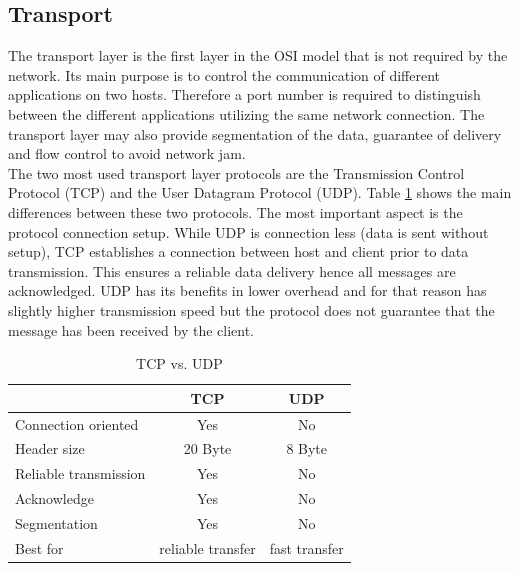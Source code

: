 \subsection{Transport} 
The transport layer is the first layer in the OSI model that is not required by
the network. Its main purpose is to control the communication of different
applications on two hosts. Therefore a port number is required to distinguish
between the different applications utilizing the same network connection. The
transport layer may also provide segmentation of the data, guarantee of delivery
and flow control to avoid network jam.
\\

The two most used transport layer protocols are the Transmission Control
Protocol (TCP) and the User Datagram Protocol (UDP). Table \ref{tab:tcpudp}
shows the main differences between these two protocols. The most important
aspect is the protocol connection setup. While UDP is connection less (data is
sent without setup), TCP establishes a connection between host and client
prior to data transmission. This ensures a reliable data delivery hence all
messages are acknowledged. UDP has its benefits in lower overhead and for that
reason has slightly higher transmission speed but the protocol does not
guarantee
that the message has been received by the client.

\begin{table}[h]
    \centering
    \begin{tabular}{ l  c  c }
        \toprule
         & \textbf{TCP} & \textbf{UDP} \\
        \midrule
        Connection oriented & Yes & No \\
        Header size & 20 Byte & 8 Byte \\
        Reliable transmission & Yes & No \\
        Acknowledge & Yes & No \\
        Segmentation & Yes & No \\
        Best for & reliable transfer & fast transfer  \\
        \bottomrule
    \end{tabular}
    \caption{TCP vs. UDP}
    \label{tab:tcpudp}
\end{table}

%
%


